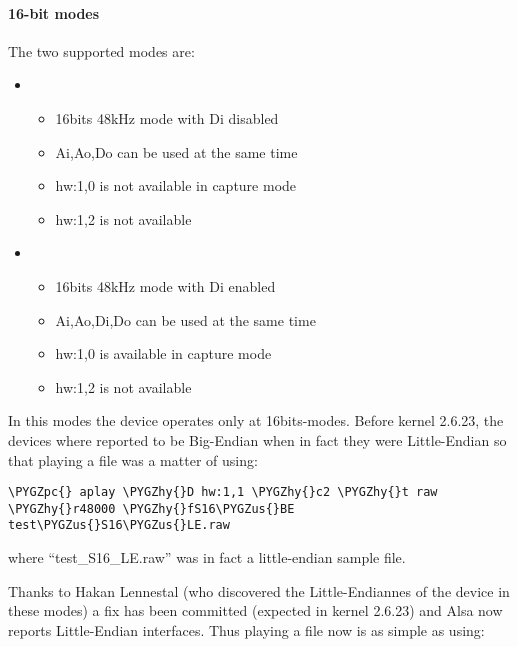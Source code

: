 \documentclass[a4paper,8pt,english]{sphinxmanual}
\def\PYGZus{\char`\_}
\def\PYGZpc{\char`\%}
\def\PYGZhy{\char`\-}
\begin{document}
\paragraph{16-bit modes}
\label{sound/cards/audiophile-usb:bit-modes}
The two supported modes are:
\begin{itemize}
\item {} 
\begin{itemize}
\item {} 
16bits 48kHz mode with Di disabled

\item {} 
Ai,Ao,Do can be used at the same time

\item {} 
hw:1,0 is not available in capture mode

\item {} 
hw:1,2 is not available

\end{itemize}

\item {} 
\begin{itemize}
\item {} 
16bits 48kHz mode with Di enabled

\item {} 
Ai,Ao,Di,Do can be used at the same time

\item {} 
hw:1,0 is available in capture mode

\item {} 
hw:1,2 is not available

\end{itemize}

\end{itemize}

In this modes the device operates only at 16bits-modes. Before kernel 2.6.23,
the devices where reported to be Big-Endian when in fact they were Little-Endian
so that playing a file was a matter of using:

\begin{Verbatim}[commandchars=\\\{\}]
\PYGZpc{} aplay \PYGZhy{}D hw:1,1 \PYGZhy{}c2 \PYGZhy{}t raw \PYGZhy{}r48000 \PYGZhy{}fS16\PYGZus{}BE test\PYGZus{}S16\PYGZus{}LE.raw
\end{Verbatim}

where ``test\_S16\_LE.raw'' was in fact a little-endian sample file.

Thanks to Hakan Lennestal (who discovered the Little-Endiannes of the device in
these modes) a fix has been committed (expected in kernel 2.6.23) and
Alsa now reports Little-Endian interfaces. Thus playing a file now is as simple as
using:
\end{document}
